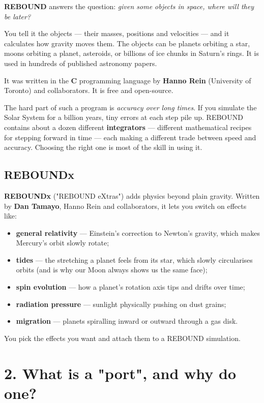 \documentclass[11pt]{article}
\begin{document}
\textbf{REBOUND} answers the question: \emph{given some objects in space, where will they be later?}

You tell it the objects --- their masses, positions and velocities --- and it calculates how gravity moves them. The objects can be planets orbiting a star, moons orbiting a planet, asteroids, or billions of ice chunks in Saturn's rings. It is used in hundreds of published astronomy papers.

It was written in the \textbf{C} programming language by \textbf{Hanno Rein} (University of Toronto) and collaborators. It is free and open-source.

The hard part of such a program is \emph{accuracy over long times}. If you simulate the Solar System for a billion years, tiny errors at each step pile up. REBOUND contains about a dozen different \textbf{integrators} --- different mathematical recipes for stepping forward in time --- each making a different trade between speed and accuracy. Choosing the right one is most of the skill in using it.

\subsection{REBOUNDx}

\textbf{REBOUNDx} ("REBOUND eXtras") adds physics beyond plain gravity. Written by \textbf{Dan Tamayo}, Hanno Rein and collaborators, it lets you switch on effects like:

\begin{itemize}
\item \textbf{general relativity} --- Einstein's correction to Newton's gravity, which makes Mercury's orbit slowly rotate;
\item \textbf{tides} --- the stretching a planet feels from its star, which slowly circularises orbits (and is why our Moon always shows us the same face);
\item \textbf{spin evolution} --- how a planet's rotation axis tips and drifts over time;
\item \textbf{radiation pressure} --- sunlight physically pushing on dust grains;
\item \textbf{migration} --- planets spiralling inward or outward through a gas disk.
\end{itemize}

You pick the effects you want and attach them to a REBOUND simulation.

\section{2. What is a "port", and why do one?}
\end{document}
